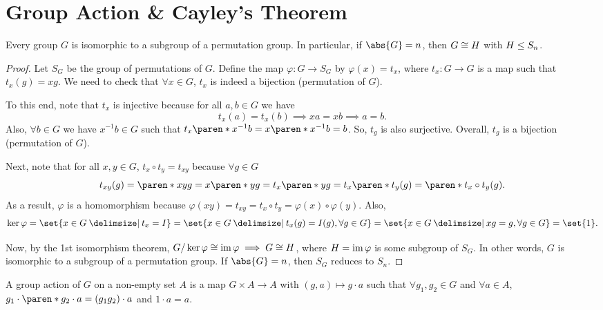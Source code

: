 \documentclass[11pt]{penrose}
\begin{document}
\section{Group Action \& Cayley's Theorem}
\begin{nthm}
    Every group $G$ is isomorphic to a subgroup of a permutation group. In particular, if $\abs{G} = n$, then $G \mathrel{\cong} H$ with $H \mathrel{\leq} S_{n}$.
\end{nthm}
\begin{proof}
    Let $S_{G}$ be the group of permutations of $G$. Define the map $\varphi : G \to S_{G}$ by $\varphi(x) = t_{x}$, where $t_{x} : G \to G$ is a map such that $t_{x}(g) = xg$. We need to check that $\forall x \in G$, $t_{x}$ is indeed a bijection (permutation of $G$).

    To this end, note that $t_{x}$ is injective because for all $a, b \in G$ we have
    \begin{equation*}
        t_{x}(a) = t_{x}(b) \implies xa = xb \implies a = b.
    \end{equation*}
    Also, $\forall b \in G$ we have $x^{-1}b \in G$ such that $t_{x}\paren*{x^{-1} b} = x \paren*{x^{-1} b} = b$. So, $t_{g}$ is also surjective. Overall, $t_{g}$ is a bijection (permutation of $G$).

    Next, note that for all $x, y \in G$, $t_{x} \circ t_{y} = t_{xy}$ because $\forall g \in G$
    \begin{equation*}
        t_{x y}(g)
        = \paren*{x y} g
        = x \paren*{ yg }
        = t_{x} \paren*{ yg }
        = t_{x} \paren*{ t_{y}(g) }
        = \paren*{t_{x} \circ t_{y}} (g).
    \end{equation*}
    As a result, $\varphi$ is a homomorphism because $\varphi(xy) = t_{xy} = t_{x} \circ t_{y} = \varphi(x) \circ \varphi(y)$. Also,
    \begin{align*}
        \ker\varphi
        = \set{x \in G \st t_{x} = I}
        = \set{x \in G \st t_{x}(g) = I(g), \forall g \in G}
        = \set{x \in G \st xg = g, \forall g \in G}
        = \set{1}.
    \end{align*}

    Now, by the 1st isomorphism theorem, $G / \ker\varphi \mathrel{\cong} \operatorname{im}\varphi \implies G \mathrel{\cong} H$,
    where $H = \operatorname{im}\varphi$ is some subgroup of $S_{G}$. In other words, $G$ is isomorphic to a subgroup of a permutation group. If $\abs{G} = n$, then $S_{G}$ reduces to $S_{n}$.
\end{proof}

\begin{ndfn}
    A group action of $G$ on a non-empty set $A$ is a map $G \times A \to A$ with $(g, a) \mapsto g \cdot a$ such that $\forall g_{1}, g_{2} \in G$ and $\forall a \in A$, $g_{1} \cdot \paren*{ g_{2} \cdot a } = (g_{1} g_{2}) \cdot a$ and $1 \cdot a = a$.
\end{ndfn}
\end{document}
